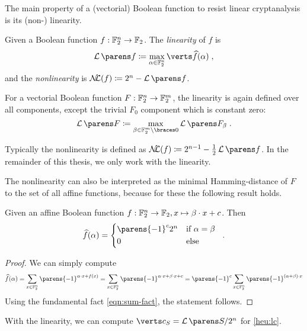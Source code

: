 The main property of a (vectorial) Boolean function to resist linear cryptanalysis is its (non-) linearity.
\begin{definition}
    Given a Boolean function $f : \mathbb{F}_2^n \to \mathbb{F}_2$.
    The \emph{linearity} of $f$ is
    \begin{equation*}
        \linearity{f} \coloneqq \max_{\alpha \in \F_2^n} \abs{\FC{f}(\alpha)}\;,
    \end{equation*}
    and the \emph{nonlinearity} is $\mathcal{N}\!\!\mathcal{L}(f) \coloneqq 2^n - \linearity{f}$.

    For a vectorial Boolean function $F : \mathbb{F}_2^n \to \mathbb{F}_2^m$, the linearity is again defined over all components, except the trivial $F_0$ component which is constant zero:
    \begin{equation*}
        \linearity{F} \coloneqq \max_{\beta \in \F_2^m \setminus \set{0}} \linearity{F_\beta}\;.
    \end{equation*}
\end{definition}
Typically the nonlinearity is defined as $\mathcal{N}\!\!\mathcal{L}(f) \coloneqq 2^{n-1} - \frac{1}{2}\linearity{f}$.
In the remainder of this thesis, we only work with the linearity.

The nonlinearity can also be interpreted as the minimal Hamming-distance of $F$ to the set of all affine functions, because for these the following result holds.
\begin{lemma}
    Given an affine Boolean function $f : \mathbb{F}_2^n \to \mathbb{F}_2, x \mapsto \beta \cdot x + c$.
    Then
    \begin{equation*}
        \FC{f}(\alpha) = \begin{cases*}
            \parens{-1}^c 2^n & if $\alpha = \beta$ \\
            0                 & else
        \end{cases*}\;.
    \end{equation*}
\end{lemma}
\begin{proof}
    We can simply compute
    \begin{equation*}
           \FC{f}(\alpha)
        = \sum_{x \in \F_2^n} \parens{-1}^{\iprod{\alpha}{x} + f(x)}
        = \sum_{x \in \F_2^n} \parens{-1}^{\iprod{\alpha}{x} + \iprod{\beta}{x} + c}
        = \parens{-1}^c \sum_{x \in \F_2^n} \parens{-1}^{\iprod{(\alpha + \beta)}{x}}
    \end{equation*}
    Using the fundamental fact \cref{eqn:sum-fact}, the statement follows.
\end{proof}
With the linearity, we can compute $\abs{c_S} = \linearity{S}/2^n$ for \cref{heu:lc}.

